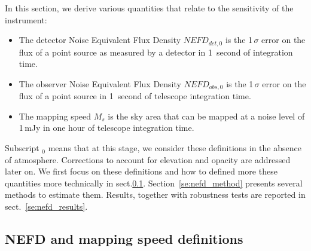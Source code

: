 
%

In this section, we derive various quantities that relate to the
sensitivity of the instrument:

\begin{itemize}
\item The detector Noise Equivalent Flux Density $NEFD_{det,0}$ is the 1\,$\sigma$
  error on the flux of a point source as measured by a detector in 1~second of
  integration time.
\item The observer Noise Equivalent Flux Density $NEFD_{obs,0}$ is the 1\,$\sigma$
  error on the flux of a point source in 1~second of telescope integration time.
\item The mapping speed $M_s$ is the sky area that can be mapped at a noise
  level of 1\,mJy in one hour of telescope integration time.
\end{itemize}

Subscript $_0$ means that at this stage, we consider these definitions in
the absence of atmosphere. Corrections to account for elevation and opacity are
addressed later on. We first focus on these definitions and how to defined more
these quantities more technically in sect.\ref{se:integration_time}. Section~\ref{se:nefd_method}
presents several methods to estimate them. Results, together with robustness
tests are reported in sect.~\ref{se:nefd_results}.

\subsection{NEFD and mapping speed definitions}
\label{se:integration_time}



